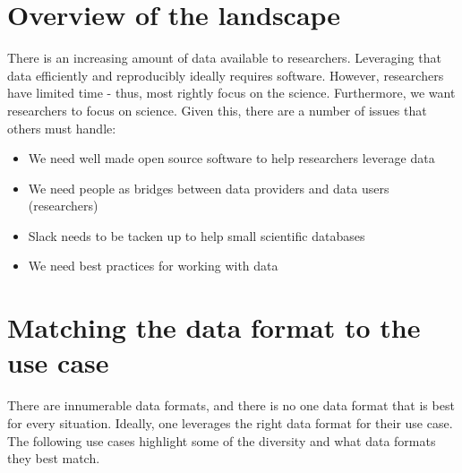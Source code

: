 \documentclass[author-year, review, 11pt]{components/elsarticle} %
\def\tightlist{}
\begin{document}
\hypertarget{overview-of-the-landscape}{%
\section{Overview of the landscape}\label{overview-of-the-landscape}}

There is an increasing amount of data available to researchers.
Leveraging that data efficiently and reproducibly ideally requires
software. However, researchers have limited time - thus, most rightly
focus on the science. Furthermore, we want researchers to focus on
science. Given this, there are a number of issues that others must
handle:

\begin{itemize}
\tightlist
\item
  We need well made open source software to help researchers leverage
  data
\item
  We need people as bridges between data providers and data users
  (researchers)
\item
  Slack needs to be tacken up to help small scientific databases
\item
  We need best practices for working with data
\end{itemize}

\hypertarget{matching-the-data-format-to-the-use-case}{%
\section{Matching the data format to the use
case}\label{matching-the-data-format-to-the-use-case}}

There are innumerable data formats, and there is no one data format that
is best for every situation. Ideally, one leverages the right data
format for their use case. The following use cases highlight some of the
diversity and what data formats they best match.
\end{document}
